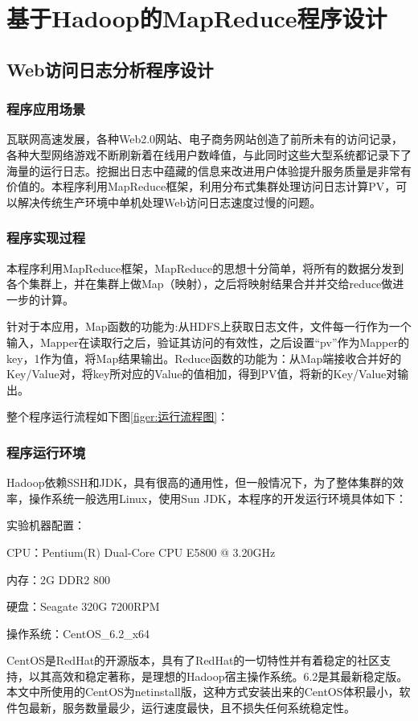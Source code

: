 \chapter{基于Hadoop的MapReduce程序设计}
\label{chap:3}

\section{Web访问日志分析程序设计}
\subsection{程序应用场景}
瓦联网高速发展，各种Web2.0网站、电子商务网站创造了前所未有的访问记录，各种大型网络游戏不断刷新着在线用户数峰值，与此同时这些大型系统都记录下了海量的运行日志。挖掘出日志中蕴藏的信息来改进用户体验提升服务质量是非常有价值的。本程序利用MapReduce框架，利用分布式集群处理访问日志计算PV，可以解决传统生产环境中单机处理Web访问日志速度过慢的问题。

\subsection{程序实现过程}
本程序利用MapReduce框架，MapReduce的思想十分简单，将所有的数据分发到各个集群上，并在集群上做Map（映射），之后将映射结果合并并交给reduce做进一步的计算。

针对于本应用，Map函数的功能为:从HDFS上获取日志文件，文件每一行作为一个输入，Mapper在读取行之后，验证其访问的有效性，之后设置“pv”作为Mapper的key，1作为值，将Map结果输出。Reduce函数的功能为：从Map端接收合并好的Key/Value对，将key所对应的Value的值相加，得到PV值，将新的Key/Value对输出。

整个程序运行流程如下图\ref{figer:运行流程图}：

\subsection{程序运行环境}
Hadoop依赖SSH和JDK，具有很高的通用性，但一般情况下，为了整体集群的效率，操作系统一般选用Linux，使用Sun JDK，本程序的开发运行环境具体如下：

实验机器配置：

CPU：Pentium(R) Dual-Core  CPU E5800 @ 3.20GHz

内存：2G DDR2 800

硬盘：Seagate 320G 7200RPM

操作系统：CentOS\_6.2\_x64
  
CentOS是RedHat的开源版本，具有了RedHat的一切特性并有着稳定的社区支持，以其高效和稳定著称，是理想的Hadoop宿主操作系统。6.2是其最新稳定版。本文中所使用的CentOS为netinstall版，这种方式安装出来的CentOS体积最小，软件包最新，服务数量最少，运行速度最快，且不损失任何系统稳定性。

